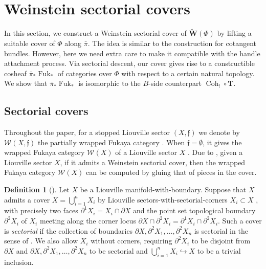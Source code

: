 \documentclass[a4paper,12pt, twoside, pdftex]{amsart}
\theoremstyle{definition}
\newtheorem{definition}[dummy]{Definition}
\numberwithin{equation}{section}
\newcommand{\Coh}{\operatorname{Coh}}
\newcommand{\del}{\partial}
\newcommand{\Fuk}{\operatorname{Fuk}}
\newcommand{\cW}{\mathcal{W}}
\newcommand{\bfT}{\mathbf{T}}
\newcommand{\bfW}{\mathbf{W}}
\newcommand{\frakf}{\mathfrak{f}}
\begin{document}
\section{Weinstein sectorial covers}
In this section,
we construct a Weinstein sectorial cover of
$\widetilde{\bfW}(\Phi)$
by lifting a suitable cover of
$\Phi$
along
$\bar{\pi}$.
The idea is similar to the construction for cotangent bundles.
However,
here we need extra care to make it compatible with the  handle attachment process.
Via sectorial descent,
our cover gives rise to a constructible cosheaf
$\bar{\pi}_* \Fuk_*$
of categories over
$\Phi$
with respect to a certain natural topology.
We show that 
$\bar{\pi}_* \Fuk_*$
is isomorphic to the $B$-side counterpart
$\Coh_! \circ \bfT$.

\subsection{Sectorial covers}
Throughout the paper,
for a stopped Liouville sector
$(X, \frakf)$
we denote by
$\cW(X, \frakf)$
the partially wrapped Fukaya category
\cite[definition 2.31]{GPS2}.
When
$\frakf = \emptyset$,
it gives the wrapped Fukaya category
$\cW(X)$
of a Liouville sector
$X$
\cite[Definition 3.36]{GPS1}.
Due to
\cite{GPS2},
given a Liouville sector
$X$,
if it admits a Weinstein sectorial cover,
then the wrapped Fukaya category
$\cW(X)$
can be computed by gluing that of pieces in the cover.

\begin{definition}[{\cite[Definition 12.19, Remark 12.20]{GPS2}}]
Let
$X$
be a Liouville manifold-with-boundary.
Suppose that
$X$
admits a cover
$X = \bigcup^n_{i = 1} X_i$
by Liouville sectors-with-sectorial-corners
$X_i \subset X$
\cite[Definition 12.14]{GPS2},
with precisely two faces
$\del^1 X_i = X_i \cap \del X$
and
the point set topological boundary
$\del^2 X_i$
of
$X_i$
meeting along the corner locus
$\del X \cap \del^2 X_i = \del^1 X_i \cap \del^2 X_i$.
Such a cover is
\emph{sectorial}
if the collection of boundaries
$\del X, \del^2 X_1, \ldots, \del^2 X_n$
is sectorial in the sense of
\cite[Definition 12.2]{GPS2}.
We also allow
$X_i$
without corners,
requiring
$\del^2 X_i$
to be disjoint from
$\del X$
and
$\del X, \del^2 X_1, \ldots, \del^2 X_n$
to be sectorial
and
$\bigcup^n_{i = 1} X_i \hookrightarrow X$
to be a trivial inclusion.
\end{definition}
\end{document}
